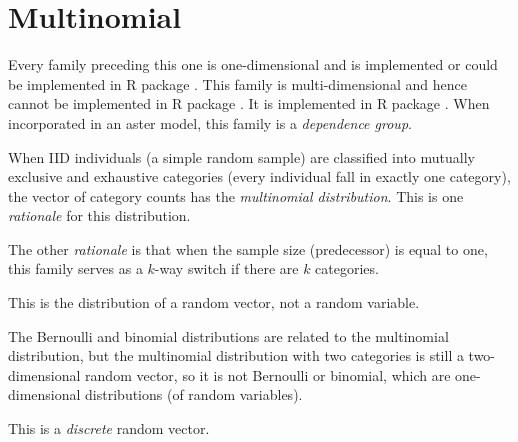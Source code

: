 \section{Multinomial}
\label{app:sec:multinomial}

Every family preceding this one is one-dimensional and is implemented
or could be implemented in R package .
This family is multi-dimensional and hence cannot be implemented in R package
.
It is implemented in R package .
When incorporated in an aster model, this family is a \emph{dependence group}.

When IID individuals (a simple random sample) are classified into mutually
exclusive and exhaustive categories (every individual fall in exactly one
category), the vector of category counts has
the \emph{multinomial distribution}.
This is one \emph{rationale} for this distribution.

The other \emph{rationale} is that when the sample size (predecessor)
is equal to one, this family serves as a $k$-way switch if there are $k$
categories.

This is the distribution of a random vector, not a random variable.

The Bernoulli and binomial distributions are related to the multinomial
distribution, but the multinomial distribution with two categories is
still a two-dimensional random vector, so it is not Bernoulli or binomial,
which are one-dimensional distributions (of random variables).

This is a \emph{discrete} random vector.

